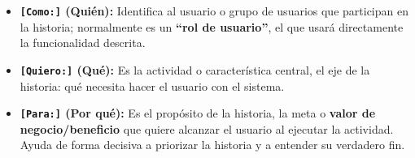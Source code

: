 \begin{itemize}[itemsep=4pt]
    \item \textbf{\texttt{[Como:]} (Quién):} Identifica al usuario o grupo de usuarios que participan en la historia; normalmente es un \textbf{``rol de usuario''}, el que usará directamente la funcionalidad descrita.
    \item \textbf{\texttt{[Quiero:]} (Qué):} Es la actividad o característica central, el eje de la historia: qué necesita hacer el usuario con el sistema.
    \item \textbf{\texttt{[Para:]} (Por qué):} Es el propósito de la historia, la meta o \textbf{valor de negocio/beneficio} que quiere alcanzar el usuario al ejecutar la actividad. Ayuda de forma decisiva a priorizar la historia y a entender su verdadero fin.
\end{itemize}

